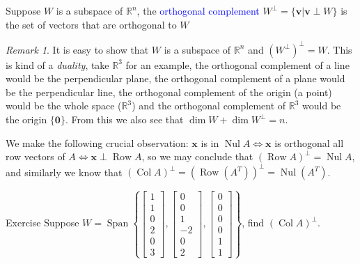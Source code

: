 \documentclass{beamer}
\DeclareMathOperator{\Nul}{Nul}
\DeclareMathOperator{\Col}{Col}
\DeclareMathOperator{\Row}{Row}
\theoremstyle{definition}
\theoremstyle{remark}
\newtheorem*{remark}{Remark}
\DeclareMathOperator{\Span}{Span}
\begin{document}
\begin{frame}[t]
\begin{definition}
Suppose $W$ is a subspace of $\mathbb R^n$, the \textcolor{blue}{orthogonal complement} $W^\perp=\{\mathbf v|\mathbf v\perp W\}$ is the set of vectors that are orthogonal to $W$
\end{definition}
\pause
\begin{remark}
It is easy to show that $W$ is a subspace of $\mathbb R^n$ and $(W^\perp)^\perp=W$. This is kind of a \textit{duality}, take $\mathbb R^3$ for an example, the orthogonal complement of a line would be the perpendicular plane, the orthogonal complement of a plane would be the perpendicular line, the orthogonal complement of the origin (a point) would be the whole space ($\mathbb R^3$) and the orthogonal complement of $\mathbb R^3$ would be the origin $\{\mathbf 0\}$. From this we also see that $\dim W+\dim W^\perp=n$.
\end{remark}
\end{frame}

\begin{frame}[t]
We make the following crucial observation: $\mathbf x$ is in $\Nul A\iff\mathbf x$ is orthogonal all row vectors of $A\iff \mathbf x\perp\Row A$, so we may conclude that $(\Row A)^\perp=\Nul A$, and similarly we know that $(\Col A)^\perp=(\Row(A^T))^\perp=\Nul(A^T)$.
\end{frame}

\begin{frame}[t]{Exercise}
Suppose $W=\Span\left\{\begin{bmatrix}
1\\1\\0\\2\\0\\3
\end{bmatrix},\begin{bmatrix}
0\\0\\1\\-2\\0\\2
\end{bmatrix},\begin{bmatrix}
0\\0\\0\\0\\1\\1
\end{bmatrix}\right\}$, find $(\Col A)^\perp$.
\end{frame}



\end{document}
